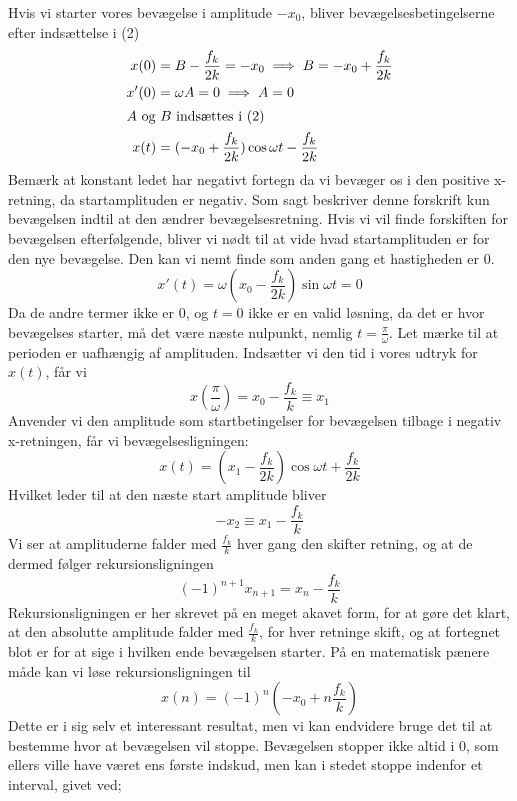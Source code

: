 Hvis vi starter vores bevægelse i amplitude $-x_0$, bliver bevægelsesbetingelserne efter indsættelse i (2)
\begin{align*}
    x(0) &= B - \frac{f_k}{2k} = -x_0 \implies B = -x_0 + \frac{f_k}{2k} \\
    x'(0) &= \omega A = 0 \implies A = 0 \\
    \shortintertext{$A$ og $B$ indsættes i (2)}
    x(t) &= (-x_0 + \frac{f_k}{2k})\cos \omega t - \frac{f_k}{2k}
\end{align*}
Bemærk at konstant ledet har negativt fortegn da vi bevæger os i den positive x-retning, da startamplituden er negativ.
Som sagt beskriver denne forskrift kun bevægelsen indtil at den ændrer bevægelsesretning. 
Hvis vi vil finde forskiften for bevægelsen efterfølgende, bliver vi nødt til at vide hvad startamplituden er for den nye bevægelse.
Den kan vi nemt finde som anden gang et hastigheden er 0.
\[
x'(t) = \omega(x_0 - \frac{f_k}{2k})\sin \omega t = 0
\]
Da de andre termer ikke er 0, og $t = 0$ ikke er en valid løsning, da det er hvor bevægelses starter, må det være næste nulpunkt, nemlig $t = \frac{\pi}{\omega}$. 
Let mærke til at perioden er uafhængig af amplituden.
Indsætter vi den tid i vores udtryk for $x(t)$, får vi 
\[
x(\frac{\pi}{\omega}) = x_0 - \frac{f_k}{k} \equiv x_1
\]
Anvender vi den amplitude som startbetingelser for bevægelsen tilbage i negativ x-retningen, får vi bevægelsesligningen:
\[
x(t) = (x_1 - \frac{f_k}{2k})\cos \omega t + \frac{f_k}{2k}
\]
Hvilket leder til at den næste start amplitude bliver 
\[
-x_2 \equiv x_1 - \frac{f_k}{k}
\]
Vi ser at amplituderne falder med $\frac{f_k}{k}$ hver gang den skifter retning, og at de dermed følger rekursionsligningen
\begin{equation}
    (-1)^{n+1} x_{n+1} = x_n - \frac{f_k}{k}
\end{equation}
Rekursionsligningen er her skrevet på en meget akavet form, for at gøre det klart, at den absolutte amplitude falder med $\frac{f_k}{k}$, for hver retninge skift, 
og at fortegnet blot er for at sige i hvilken ende bevægelsen starter. På en matematisk pænere måde kan vi løse rekursionsligningen til
\begin{equation}
    x(n) = (-1)^n (-x_0 + n \frac{f_k}{k})
\end{equation}
Dette er i sig selv et interessant resultat, men vi kan endvidere bruge det til at bestemme hvor at bevægelsen vil stoppe. 
Bevægelsen stopper ikke altid i 0, som ellers ville have været ens første indskud, men kan i stedet stoppe indenfor et interval, givet ved;
